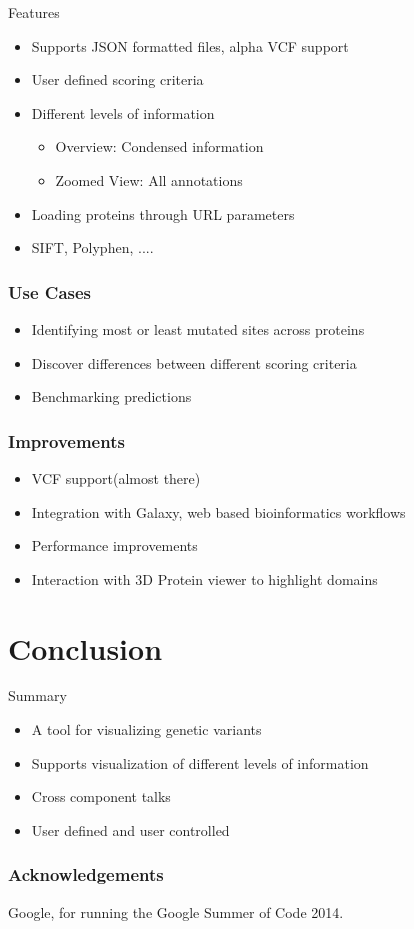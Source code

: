 \documentclass[10pt, compress]{beamer}
\renewcommand{\(}{\begin{columns}}
\renewcommand{\)}{\end{columns}}
\newcommand{\<}[1]{\begin{column}{#1}}
\renewcommand{\>}{\end{column}}
\begin{document}
\begin{frame}{Features}
\begin{itemize}
\item Supports JSON formatted files, alpha VCF support
\item User defined scoring criteria
\item Different levels of information
\begin{itemize}
\item Overview: Condensed information
\item Zoomed View: All annotations 
\end{itemize}
\item Loading proteins through URL parameters
\item SIFT, Polyphen, ....

\end{itemize}
\end{frame}

\begin{frame}
\frametitle{Use Cases}
\begin{itemize}[<+- | alert@+>]
\item Identifying most or least mutated sites across proteins
\item Discover differences between different scoring criteria
\item Benchmarking predictions
\end{itemize}

\end{frame}

\begin{frame}
\frametitle{Improvements}
\begin{itemize}[<+- | alert@+>]
\item VCF support(almost there)
\item Integration with Galaxy, web based bioinformatics workflows
\item Performance improvements
\item Interaction with 3D Protein viewer to highlight domains
\end{itemize}
\end{frame}

\section{Conclusion}

\begin{frame}{Summary}
\begin{itemize}
\item A tool for visualizing genetic variants
\item Supports visualization of different levels of information
\item Cross component talks
\item User defined and user controlled

\end{itemize}

\end{frame}

\begin{frame}
\frametitle{Acknowledgements}
Google, for running the Google Summer of Code 2014.
\end{frame}

\end{document}
